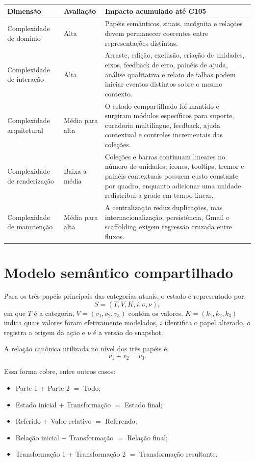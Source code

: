 \documentclass[12pt,a4paper]{article}
\begin{document}
\begin{tabularx}{\textwidth}{p{3.8cm}p{2.8cm}X}
\toprule
\textbf{Dimensão} & \textbf{Avaliação} & \textbf{Impacto acumulado até C105}\\
\midrule
Complexidade de domínio & Alta & Papéis semânticos, sinais, incógnita e relações devem permanecer coerentes entre representações distintas.\\
Complexidade de interação & Alta & Arraste, edição, exclusão, criação de unidades, eixos, feedback de erro, painéis de ajuda, análise qualitativa e relato de falhas podem iniciar eventos distintos sobre o mesmo contexto.\\
Complexidade arquitetural & Média para alta & O estado compartilhado foi mantido e surgiram módulos específicos para suporte, curadoria multilíngue, feedback, ajuda contextual e controles incrementais das coleções.\\
Complexidade de renderização & Baixa a média & Coleções e barras continuam lineares no número de unidades; ícones, tooltips, tremor e painéis contextuais possuem custo constante por quadro, enquanto adicionar uma unidade redistribui a grade em tempo linear.\\
Complexidade de manutenção & Média para alta & A centralização reduz duplicações, mas internacionalização, persistência, Gmail e scaffolding exigem regressão cruzada entre fluxos.\\
\bottomrule
\end{tabularx}

\section{Modelo semântico compartilhado}

Para os três papéis principais das categorias atuais, o estado é representado por:
\[
S = (T, V, K, i, o, \nu),
\]
em que $T$ é a categoria, $V=(v_1,v_2,v_3)$ contém os valores, $K=(k_1,k_2,k_3)$ indica quais valores foram efetivamente modelados, $i$ identifica o papel alterado, $o$ registra a origem da ação e $\nu$ é a versão do snapshot.

A relação canônica utilizada no nível dos três papéis é:
\[
v_1 + v_2 = v_3.
\]

Essa forma cobre, entre outros casos:
\begin{itemize}[noitemsep]
  \item Parte 1 $+$ Parte 2 $=$ Todo;
  \item Estado inicial $+$ Transformação $=$ Estado final;
  \item Referido $+$ Valor relativo $=$ Referendo;
  \item Relação inicial $+$ Transformação $=$ Relação final;
  \item Transformação 1 $+$ Transformação 2 $=$ Transformação resultante.
\end{itemize}
\end{document}
